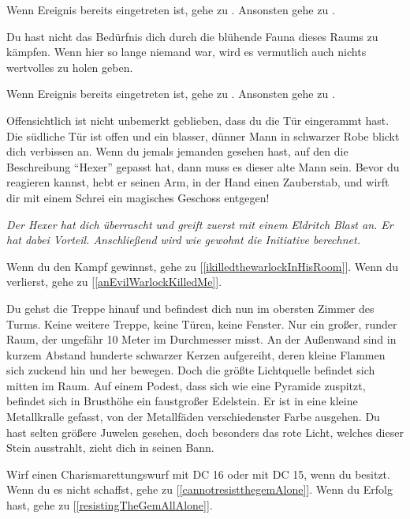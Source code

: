 Wenn Ereignis  bereits eingetreten ist, gehe zu .
Ansonsten gehe zu .


Du hast nicht das Bedürfnis dich durch die blühende Fauna dieses Raums zu kämpfen. Wenn hier so lange niemand war, wird es vermutlich auch nichts wertvolles zu holen geben.

Wenn Ereignis  bereits eingetreten ist, gehe zu .
Ansonsten gehe zu .


Offensichtlich ist nicht unbemerkt geblieben, dass du die Tür eingerammt hast. Die südliche Tür ist offen und ein blasser, dünner Mann in schwarzer Robe blickt dich verbissen an. Wenn du jemals jemanden gesehen hast, auf den die Beschreibung ``Hexer'' gepasst hat, dann muss es dieser alte Mann sein. Bevor du reagieren kannst, hebt er seinen Arm, in der Hand einen Zauberstab, und wirft dir mit einem Schrei ein magisches Geschoss entgegen!

\textit{Der Hexer hat dich überrascht und greift zuerst mit einem Eldritch Blast an. Er hat dabei Vorteil. Anschließend wird wie gewohnt die Initiative berechnet.}

\monsterWarlock

Wenn du den Kampf gewinnst, gehe zu [\ref{ikilledthewarlockInHisRoom}].
Wenn du verlierst, gehe zu [\ref{anEvilWarlockKilledMe}].


Du gehst die Treppe hinauf und befindest dich nun im obersten Zimmer des Turms. Keine weitere Treppe, keine Türen, keine Fenster. Nur ein großer, runder Raum, der ungefähr 10 Meter im Durchmesser misst. An der Außenwand sind in kurzem Abstand hunderte schwarzer Kerzen aufgereiht, deren kleine Flammen sich zuckend hin und her bewegen.
Doch die größte Lichtquelle befindet sich mitten im Raum. Auf einem Podest, dass sich wie eine Pyramide zuspitzt, befindet sich in Brusthöhe ein faustgroßer Edelstein. Er ist in eine kleine Metallkralle gefasst, von der Metallfäden verschiedenster Farbe ausgehen. Du hast selten größere Juwelen gesehen, doch besonders das rote Licht, welches dieser Stein ausstrahlt, zieht dich in seinen Bann.

Wirf einen Charismarettungswurf mit DC 16 oder mit DC 15, wenn du  besitzt. Wenn du es nicht schaffst, gehe zu [\ref{cannotresistthegemAlone}]. Wenn du Erfolg hast, gehe zu [\ref{resistingTheGemAllAlone}].

